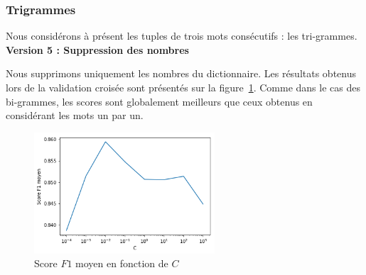 \documentclass[a4paper]{article}
\newcommand{\figref}[1]{figure~\ref{#1}}
\begin{document}
\begin{table}[H]
\centering
{}
\caption{10 bigrammes les plus polarisés pour J. Chirac et F. Mitterrand}
\label{tab:tme3-task1-v4-w}
\end{table}

\subsubsection{Trigrammes}

Nous considérons à présent les tuples de trois mots consécutifs : les tri-grammes. \\

\textbf{Version 5 : Suppression des nombres}

Nous supprimons uniquement les nombres du dictionnaire. Les résultats obtenus
lors de la validation croisée sont présentés sur la \figref{img:tme2-task1-v4}.
Comme dans le cas des bi-grammes, les scores sont globalement meilleurs que ceux
obtenus en considérant les mots un par un.

\begin{figure}[H]
	\center 
	\includegraphics[width=0.6\textwidth]{images/tme2/task1_v4.png}
    \caption{Score $F1$ moyen en fonction de $C$}
    \label{img:tme2-task1-v4}
\end{figure}
\end{document}
